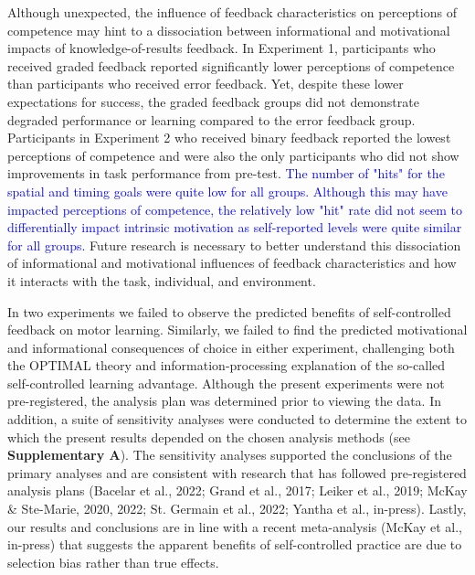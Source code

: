 \documentclass[
  man, donotrepeattitle,floatsintext]{apa7}
\begin{document}
Although unexpected, the influence of feedback characteristics on perceptions of competence may hint to a dissociation between informational and motivational impacts of knowledge-of-results feedback. In Experiment 1, participants who received graded feedback reported significantly lower perceptions of competence than participants who received error feedback. Yet, despite these lower expectations for success, the graded feedback groups did not demonstrate degraded performance or learning compared to the error feedback group. Participants in Experiment 2 who received binary feedback reported the lowest perceptions of competence and were also the only participants who did not show improvements in task performance from pre-test. \textcolor{blue}{The number of "hits" for the spatial and timing goals were quite low for all groups. Although this may have impacted perceptions of competence, the relatively low "hit" rate did not seem to differentially impact intrinsic motivation as self-reported levels were quite similar for all groups.} Future research is necessary to better understand this dissociation of informational and motivational influences of feedback characteristics and how it interacts with the task, individual, and environment.

In two experiments we failed to observe the predicted benefits of self-controlled feedback on motor learning. Similarly, we failed to find the predicted motivational and informational consequences of choice in either experiment, challenging both the OPTIMAL theory and information-processing explanation of the so-called self-controlled learning advantage. Although the present experiments were not pre-registered, the analysis plan was determined prior to viewing the data. In addition, a suite of sensitivity analyses were conducted to determine the extent to which the present results depended on the chosen analysis methods (see \textbf{Supplementary A}). The sensitivity analyses supported the conclusions of the primary analyses and are consistent with research that has followed pre-registered analysis plans (Bacelar et al., 2022; Grand et al., 2017; Leiker et al., 2019; McKay \& Ste-Marie, 2020, 2022; St. Germain et al., 2022; Yantha et al., in-press). Lastly, our results and conclusions are in line with a recent meta-analysis (McKay et al., in-press) that suggests the apparent benefits of self-controlled practice are due to selection bias rather than true effects.

\vspace{10ex}
\end{document}
